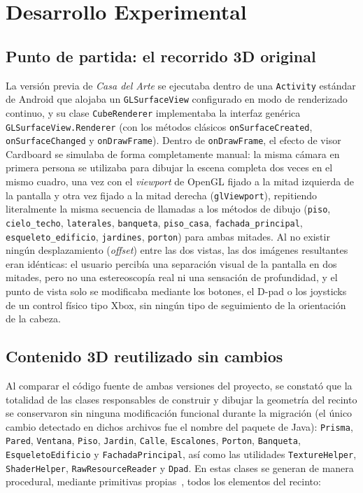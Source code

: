 \documentclass[conference]{IEEEtran}
\begin{document}
	\section{Desarrollo Experimental}
	
	\subsection{Punto de partida: el recorrido 3D original}
	La versión previa de \textit{Casa del Arte} se ejecutaba dentro de una \texttt{Activity} estándar de Android que alojaba un \texttt{GLSurfaceView} configurado en modo de renderizado continuo, y su clase \texttt{CubeRenderer} implementaba la interfaz genérica \texttt{GLSurfaceView.Renderer} (con los métodos clásicos \texttt{onSurfaceCreated}, \texttt{onSurfaceChanged} y \texttt{onDrawFrame}). Dentro de \texttt{onDrawFrame}, el efecto de visor Cardboard se simulaba de forma completamente manual: la misma cámara en primera persona se utilizaba para dibujar la escena completa dos veces en el mismo cuadro, una vez con el \textit{viewport} de OpenGL fijado a la mitad izquierda de la pantalla y otra vez fijado a la mitad derecha (\texttt{glViewport}), repitiendo literalmente la misma secuencia de llamadas a los métodos de dibujo (\texttt{piso}, \texttt{cielo\_techo}, \texttt{laterales}, \texttt{banqueta}, \texttt{piso\_casa}, \texttt{fachada\_principal}, \texttt{esqueleto\_edificio}, \texttt{jardines}, \texttt{porton}) para ambas mitades. Al no existir ningún desplazamiento (\textit{offset}) entre las dos vistas, las dos imágenes resultantes eran idénticas: el usuario percibía una separación visual de la pantalla en dos mitades, pero no una estereoscopía real ni una sensación de profundidad, y el punto de vista solo se modificaba mediante los botones, el D-pad o los joysticks de un control físico tipo Xbox, sin ningún tipo de seguimiento de la orientación de la cabeza.
	
	\subsection{Contenido 3D reutilizado sin cambios}
	Al comparar el código fuente de ambas versiones del proyecto, se constató que la totalidad de las clases responsables de construir y dibujar la geometría del recinto se conservaron sin ninguna modificación funcional durante la migración (el único cambio detectado en dichos archivos fue el nombre del paquete de Java): \texttt{Prisma}, \texttt{Pared}, \texttt{Ventana}, \texttt{Piso}, \texttt{Jardin}, \texttt{Calle}, \texttt{Escalones}, \texttt{Porton}, \texttt{Banqueta}, \texttt{EsqueletoEdificio} y \texttt{FachadaPrincipal}, así como las utilidades \texttt{TextureHelper}, \texttt{ShaderHelper}, \texttt{RawResourceReader} y \texttt{Dpad}. En estas clases se generan de manera procedural, mediante primitivas propias~\cite{munshi2008opengles}, todos los elementos del recinto:
	
\end{document}
